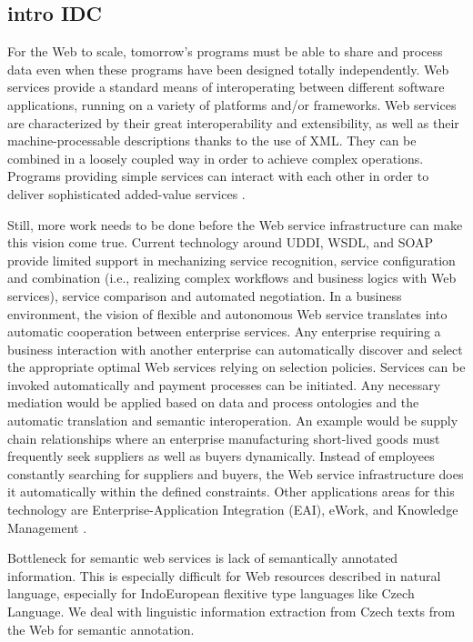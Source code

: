 \subsection{intro IDC}
For the Web to scale, tomorrow's programs must be able to share and process data even when these programs have been designed totally independently. Web services provide a standard means of interoperating between different software applications, running on a variety of platforms and/or frameworks. Web services are characterized by their great interoperability and extensibility, as well as their machine-processable descriptions thanks to the use of XML. They can be combined in a loosely coupled way in order to achieve complex operations. Programs providing simple services can interact with each other in order to deliver sophisticated added-value services \cite{biblio:W3C_Activity}.

Still, more work needs to be done before the Web service infrastructure can make this vision come true. Current technology around UDDI, WSDL, and SOAP provide limited support in mechanizing service recognition, service configuration and combination (i.e., realizing complex workflows and business logics with Web services), service comparison and automated negotiation. In a business environment, the vision of flexible and autonomous Web service translates into automatic cooperation between enterprise services. Any enterprise requiring a business interaction with another enterprise can automatically discover and select the appropriate optimal Web services relying on selection policies. Services can be invoked automatically and payment processes can be initiated. Any necessary mediation would be applied based on data and process ontologies and the automatic translation and semantic interoperation. An example would be supply chain relationships where an enterprise manufacturing short-lived goods must frequently seek suppliers as well as buyers dynamically. Instead of employees constantly searching for suppliers and buyers, the Web service infrastructure does it automatically within the defined constraints. Other applications areas for this technology are Enterprise-Application Integration (EAI), eWork, and Knowledge Management \cite{biblio:SWSI}.

Bottleneck for semantic web services is lack of semantically annotated information. This is especially difficult for Web resources described in natural language, especially for IndoEuropean flexitive type languages like Czech Language. We deal with linguistic information extraction from Czech texts from the Web for semantic annotation. 


